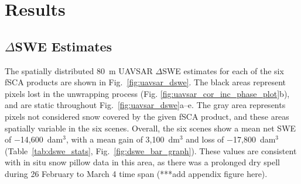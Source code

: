 \hypertarget{ch4-results}{\section{Results}\label{ch4-results}}
\hypertarget{ch4-results}{\subsection{$\Delta$SWE Estimates}\label{ch4-results}}

The spatially distributed 80~m UAVSAR $\Delta$SWE estimates for each of the six fSCA products are shown in Fig.~\ref{fig:uavsar_dswe}. The black areas represent pixels lost in the unwrapping process (Fig. \ref{fig:uavsar_cor_inc_phase_plot}b), and are static throughout Fig.~\ref{fig:uavsar_dswe}a--e. The gray area represents pixels not considered snow covered by the given fSCA product, and these areas spatially variable in the six scenes. Overall, the six scenes show a mean net SWE of $-$14,600~dam$^{3}$, with a mean gain of 3,100~dm$^{3}$ and loss of $-$17,800~dam$^{3}$ (Table~\ref{tab:dswe_stats}, Fig.~\ref{fig:dswe_bar_graph}). These values are consistent with in situ snow pillow data in this area, as there was a prolonged dry spell during 26 February to March 4 time span (***add appendix figure here).

